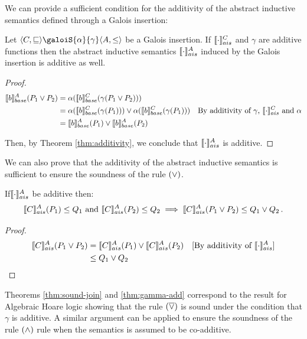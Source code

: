 \documentclass[
  10pt,       %
  twoside,    %
  a4paper,    %
  english,    %
  tikz,       %
  openright,  %
]{book}
\begin{document}
We can provide a sufficient condition for the additivity of the abstract 
inductive semantics defined through a Galois insertion:
\begin{theorem}
  \label{thm:gamma-add}
  Let $\langle C, \sqsubseteq \rangle \galoiS{\alpha}{\gamma} \langle A, \leq 
  \rangle$ be a Galois insertion. If $\asem[C]{\cdot}$ and $\gamma$ are 
  additive functions then the abstract inductive semantics $\asem[A]{\cdot}$ induced 
  by the Galois insertion is additive as well.
\end{theorem}
\begin{proof}
  \begin{align*}
    \bsem{b}^A(P_1 \join P_2)
      &= \alpha(\bsem{b}^C(\gamma(P_1 \join P_2))) \\
      &= \alpha(\bsem{b}^C(\gamma(P_1))) \join\alpha(\bsem{b}^C(\gamma(P_1)))\quad \text{By additivity of $\gamma$, $\asem[C]{\cdot}$ and $\alpha$}\\   
      &= \bsem{b}^A(P_1) \join \bsem{b}^A(P_2)
  \end{align*}

  Then, by Theorem \ref{thm:additivity}, we conclude that $\asem{\cdot}$ is additive.
\end{proof}

We can also prove that the additivity of the abstract inductive
semantics is sufficient to ensure the soundness of the  rule $(\join)$.

\begin{theorem}
  \label{thm:sound-join}
  If$\asem{\cdot}$ be additive then:
  $$\asem{C}(P_1) \leq Q_1 \text{ and } \asem{C}(P_2) \leq Q_2 \implies
  \asem{C}(P_1 \join P_2) \leq Q_1 \join Q_2\, .$$
\end{theorem}
\begin{proof}
  \begin{align*}
    \asem{C}(P_1 \join P_2)
      &= \asem{C}(P_1) \join \asem{C}(P_2)
      &\text{[By additivity of $\asem{\cdot}$]} \\
      &\leq Q_1 \join Q_2 
  \end{align*}
\end{proof}

Theorems \ref{thm:sound-join} and \ref{thm:gamma-add} correspond to the result
for Algebraic Hoare logic \cite[Theorem 6]{Cousot12}
showing that the rule $(\overline{\join})$ is sound under the
condition that $\gamma$ is additive.
A similar argument can be applied to ensure the soundness of the rule $(\meet)$ rule 
when the semantics is assumed to be co-additive.
\end{document}
